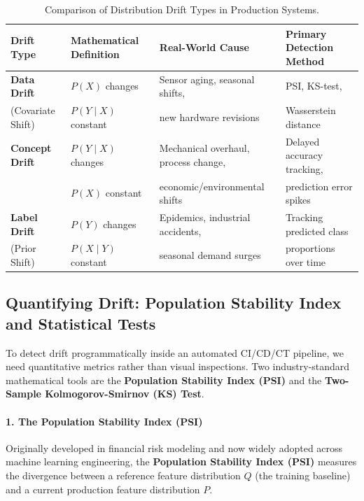 \begin{table}[htbp]
\centering
\small
\caption{Comparison of Distribution Drift Types in Production Systems.}\label{tab:drift_comparison}
\begin{tabular}{@{}llll@{}}
\toprule
\textbf{Drift Type} & \textbf{Mathematical Definition} & \textbf{Real-World Cause} & \textbf{Primary Detection Method} \\ \midrule
\textbf{Data Drift} & $P(X)$ changes & Sensor aging, seasonal shifts, & PSI, KS-test, \\
(Covariate Shift) & $P(Y \mid X)$ constant & new hardware revisions & Wasserstein distance \\ \addlinespace
\textbf{Concept Drift} & $P(Y \mid X)$ changes & Mechanical overhaul, process change, & Delayed accuracy tracking, \\
 & $P(X)$ constant & economic/environmental shifts & prediction error spikes \\ \addlinespace
\textbf{Label Drift} & $P(Y)$ changes & Epidemics, industrial accidents, & Tracking predicted class \\
(Prior Shift) & $P(X \mid Y)$ constant & seasonal demand surges & proportions over time \\ \bottomrule
\end{tabular}
\end{table}

\subsection{Quantifying Drift: Population Stability Index and Statistical Tests}\label{subsec:quantifying_drift}

To detect drift programmatically inside an automated CI/CD/CT pipeline, we need quantitative metrics rather than visual inspections. Two industry-standard mathematical tools are the \textbf{Population Stability Index (PSI)} and the \textbf{Two-Sample Kolmogorov-Smirnov (KS) Test}.

\paragraph{1. The Population Stability Index (PSI)}
Originally developed in financial risk modeling and now widely adopted across machine learning engineering, the \textbf{Population Stability Index (PSI)} measures the divergence between a reference feature distribution $Q$ (the training baseline) and a current production feature distribution $P$.

